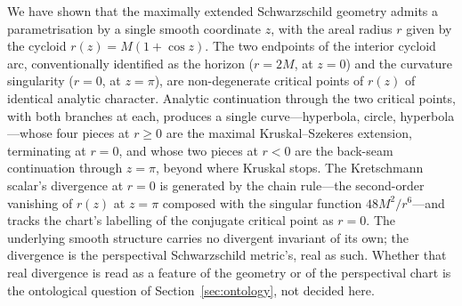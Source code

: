 \documentclass[11pt,a4paper]{article}
\theoremstyle{definition}
\begin{document}
We have shown that the maximally extended Schwarzschild geometry admits a parametrisation by a single smooth coordinate $z$, with the areal radius $r$ given by the cycloid $r(z) = M(1+\cos z)$. The two endpoints of the interior cycloid arc, conventionally identified as the horizon ($r = 2M$, at $z = 0$) and the curvature singularity ($r = 0$, at $z = \pi$), are non-degenerate critical points of $r(z)$ of identical analytic character. Analytic continuation through the two critical points, with both branches at each, produces a single curve---hyperbola, circle, hyperbola---whose four pieces at $r \geq 0$ are the maximal Kruskal--Szekeres extension, terminating at $r=0$, and whose two pieces at $r<0$ are the back-seam continuation through $z=\pi$, beyond where Kruskal stops. The Kretschmann scalar's divergence at $r = 0$ is generated by the chain rule---the second-order vanishing of $r(z)$ at $z = \pi$ composed with the singular function $48M^2/r^6$---and tracks the chart's labelling of the conjugate critical point as $r = 0$. The underlying smooth structure carries no divergent invariant of its own; the divergence is the perspectival Schwarzschild metric's, real as such. Whether that real divergence is read as a feature of the geometry or of the perspectival chart is the ontological question of Section~\ref{sec:ontology}, not decided here.
\end{document}

